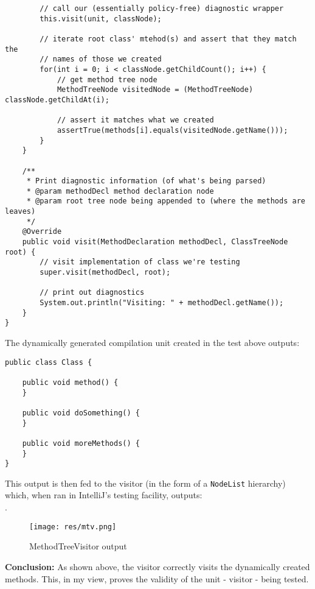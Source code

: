 \documentclass[9pt]{article}
\renewenvironment{framed}[1][\hsize]
   {\MakeFramed{\hsize#1\advance\hsize-\width \FrameRestore}}%
   {\endMakeFramed}
\begin{document}
\begin{framed}[1.2\textwidth]
\begin{verbatim}
        // call our (essentially policy-free) diagnostic wrapper
        this.visit(unit, classNode);

        // iterate root class' mtehod(s) and assert that they match the
        // names of those we created
        for(int i = 0; i < classNode.getChildCount(); i++) {
            // get method tree node
            MethodTreeNode visitedNode = (MethodTreeNode) classNode.getChildAt(i);

            // assert it matches what we created
            assertTrue(methods[i].equals(visitedNode.getName()));
        }
    }

    /**
     * Print diagnostic information (of what's being parsed)
     * @param methodDecl method declaration node
     * @param root tree node being appended to (where the methods are leaves)
     */
    @Override
    public void visit(MethodDeclaration methodDecl, ClassTreeNode root) {
        // visit implementation of class we're testing
        super.visit(methodDecl, root);

        // print out diagnostics
        System.out.println("Visiting: " + methodDecl.getName());
    }
}	
				\end{verbatim}
			\end{framed}

			The dynamically generated compilation unit created in the test above
			outputs:\\

			\begin{framed}[1.2\textwidth]	
				\begin{verbatim}
public class Class {

    public void method() {
    }

    public void doSomething() {
    }

    public void moreMethods() {
    }
}
				\end{verbatim}
			\end{framed}

			This output is then fed to the visitor (in the form of a
			\texttt{NodeList} hierarchy) which, when ran in IntelliJ's testing
			facility, outputs:\\.

			\begin{figure}[H]
				\centering
				\texttt{[image: res/mtv.png]}
				\caption{MethodTreeVisitor output}
			\end{figure}
			
			\textbf{Conclusion:}
			As shown above, the visitor correctly visits the dynamically created
			methods. This, in my view, proves the validity of the unit -
			visitor - being tested.\\
				
\end{document}
